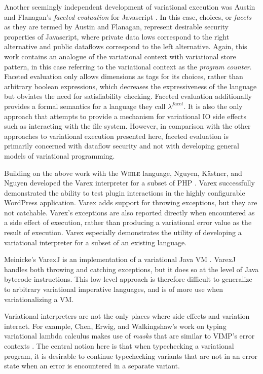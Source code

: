 \documentclass[12pt,oneside]{book}
\begin{document}
 Another seemingly independent development of variational execution was Austin and Flanagan's \emph{faceted evaluation} for Javascript \cite{faceted}.
 In this case, choices, or \emph{facets} as they are termed by Austin and Flanagan, represent desirable security properties of Javascript, where
 private data lows correspond to the right alternative and public dataflows correspond to the left alternative.
 Again, this work contains an analogue of the variational context with variational store pattern, in this case referring to the variational context as
 the \emph{program counter}. Faceted evaluation only allows dimensions as tags for its choices, rather than arbitrary boolean expressions, which
 decreases the expressiveness of the language but obviates the need for satisfiability checking. Faceted evaluation additionally provides a formal
 semantics for a language they call $\lambda^{\mathit{facet}}$. It is also the only approach that attempts to provide a mechanism for variational IO
 side effects such as interacting with the file system. However, in comparison with the other approaches to variational execution presented here,
 faceted evaluation is primarily concerned with dataflow security and not with developing general models of variational programming.
 
 Building on the above work with the \textsc{While} language, Nguyen, K\"astner, and Nguyen developed the Varex interpreter for a subset of PHP \cite{varex}.
 Varex successfully demonstrated the ability to test plugin interactions in the highly configurable WordPress application. Varex adds support for throwing
 exceptions, but they are not catchable. Varex's exceptions are also reported directly when encountered as a side effect of execution, rather than producing
 a variational error value as the result of execution. Varex especially demonstrates the utility of developing a variational interpreter for a subset of an
 existing language.
 
 Meinicke's VarexJ is an implementation of a variational Java VM \cite{varexj}. VarexJ handles both throwing and catching exceptions, but it does so
 at the level of Java bytecode instructions. This low-level approach is therefore difficult to generalize to arbitrary variational imperative languages, and
 is of more use when variationalizing a VM.
 
 Variational interpreters are not the only places where side effects and variation interact. For example, Chen, Erwig, and Walkingshaw's work
 on typing variational lambda calculus makes use of \emph{masks} that are similar to VIMP's error contexts \cite{CEW12icfp}. The central
 notion here is that when typechecking a variational program, it is desirable to continue typechecking variants that are not in an error state when
 an error is encountered in a separate variant.
\end{document}
